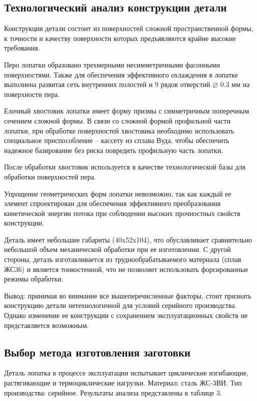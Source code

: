 \subsection{Технологический анализ конструкции детали}

Конструкция детали состоит из поверхностей сложной пространственной формы, к точности и качеству поверхности которых предъявляются крайне высокие требования.

Перо лопатки образовано трехмерными несимметричными фасонными поверхностями. Также для обеспечения эффективного охлаждения в лопатке выполнена развитая сеть внутренних полостей и 9 рядов отверстий $\diameter$ 0.3 мм на поверхности пера.

Елочный хвостовик лопатки имеет форму призмы с симметричным поперечным сечением сложной формы. В связи со сложной формой профильной части лопатки, при обработке поверхностей хвостовика необходимо использовать специальное приспособление – кассету из сплава Вуда, чтобы обеспечить надежное базирование без риска повредить профильную часть лопатки.

После обработки хвостовик используется в качестве технологической базы для обработки поверхностей пера.

Упрощение геометрических форм лопатки невозможно, так как каждый ее элемент спроектирован для обеспечения эффективного преобразования кинетической энергии потока при соблюдении высоких прочностных свойств конструкции.

Деталь имеет небольшие габариты (40x52x104), что обуславливает сравнительно небольшой объем механической обработки при ее изготовлении. С другой стороны, деталь изготавливается из труднообрабатываемого материала (сплав ЖС36) и является тонкостенной, что не позволяет использовать форсированные режимы обработки.

Вывод: принимая во внимание все вышеперечисленные факторы, стоит признать конструкцию детали нетехнологичной для условий серийного производства. Однако изменение ее конструкции с сохранением эксплуатационных свойств не представляется возможным.

\subsection{Выбор метода изготовления заготовки}
Деталь лопатка в процессе эксплуатации испытывает циклические изгибающие, растягивающие и термоциклические нагрузки. Материал: сталь ЖС-3ВИ. Тип производства: серийное.
Результаты анализа представлены в таблице 3.

